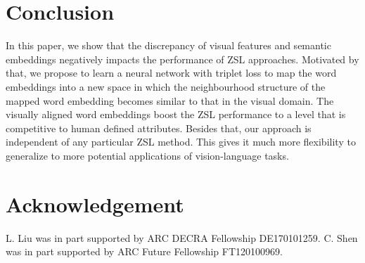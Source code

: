 \documentclass{bmvc2k}
\begin{document}
\section{Conclusion}
In this paper, we show that the discrepancy of visual features and semantic embeddings negatively impacts the performance of ZSL approaches. Motivated by that, we propose to learn a neural network with triplet loss to map the word embeddings into a new space in which the neighbourhood structure of the mapped word embedding becomes similar to that in the visual domain. The visually aligned word embeddings boost the ZSL performance to a level that is competitive to human defined attributes. Besides that, our approach is independent of any particular ZSL method. This gives it much more flexibility to generalize to more potential applications of vision-language tasks.





\section*{Acknowledgement}
L. Liu was in part supported by ARC DECRA Fellowship DE170101259.
C. Shen was in part supported by ARC Future Fellowship FT120100969.




%



%
%
%
%
%
%

%


\end{document}
